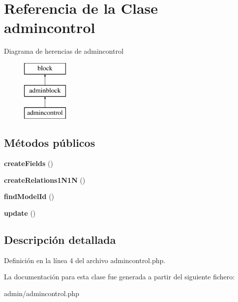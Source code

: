 \hypertarget{classadmincontrol}{\section{\-Referencia de la \-Clase admincontrol}
\label{classadmincontrol}
}
\-Diagrama de herencias de admincontrol\begin{figure}[H]
\begin{center}
\leavevmode
\includegraphics[height=3.000000cm]{classadmincontrol}
\end{center}
\end{figure}
\subsection*{\-Métodos públicos}
\begin{DoxyCompactItemize}
\item 
\hypertarget{classadmincontrol_a105d0b8037931db4a31acb5eb35db838}{{\bfseries create\-Fields} ()}\label{classadmincontrol_a105d0b8037931db4a31acb5eb35db838}

\item 
\hypertarget{classadmincontrol_a678192be99fa0eddbe86d999e9d573f2}{{\bfseries create\-Relations1\-N1\-N} ()}\label{classadmincontrol_a678192be99fa0eddbe86d999e9d573f2}

\item 
\hypertarget{classadmincontrol_a375df9422444a3312a77931d41e7c565}{{\bfseries find\-Model\-Id} ()}\label{classadmincontrol_a375df9422444a3312a77931d41e7c565}

\item 
\hypertarget{classadmincontrol_a8996c04e21d903aca9ad406b6d274aba}{{\bfseries update} ()}\label{classadmincontrol_a8996c04e21d903aca9ad406b6d274aba}

\end{DoxyCompactItemize}


\subsection{\-Descripción detallada}


\-Definición en la línea 4 del archivo admincontrol.\-php.



\-La documentación para esta clase fue generada a partir del siguiente fichero\-:\begin{DoxyCompactItemize}
\item 
admin/admincontrol.\-php\end{DoxyCompactItemize}
